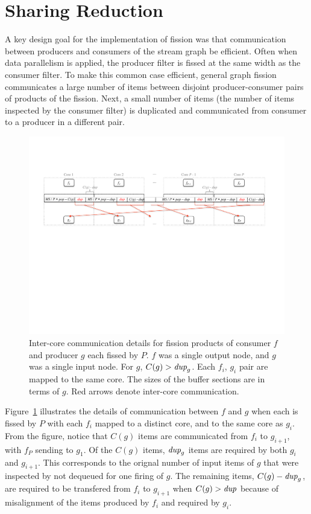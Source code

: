 \section{Sharing Reduction}

A key design goal for the implementation of fission was that
communication between producers and consumers of the stream graph be
efficient.  Often when data parallelism is applied, the producer
filter is fissed at the same width as the consumer filter.  To make
this common case efficient, general graph fission communicates a large
number of items between disjoint producer-consumer pairs of products
of the fission.  Next, a small number of items (the number of items
inspected by the consumer filter) is duplicated and communicated from
consumer to a producer in a different pair.

\begin{figure}[t]
\centering
\includegraphics[width=6in]{figures/remaining-dup-case.pdf}
\caption[Extra inter-core communication when $C(g) > \mt{dup}_g$.]
{Inter-core communication details for fission products of consumer $f$
  and producer $g$ each fissed by $P$.  $f$ was a single output node,
  and $g$ was a single input node.  For $g$, $C(g) > \mt{dup}_g$.
  Each $f_i$, $g_i$ pair are mapped to the same core.  The sizes of
  the buffer sections are in terms of $g$. Red arrows denote
  inter-core communication.  \label{fig:remaining-dup}}
\end{figure}

Figure~\ref{fig:remaining-dup} illustrates the details of
communication between $f$ and $g$ when each is fissed by $P$ with each
$f_i$ mapped to a distinct core, and to the same core as $g_i$.  From
the figure, notice that $C(g)$ items are communicated from $f_i$ to
$g_{i+ 1}$, with $f_P$ sending to $g_1$.  Of the $C(g)$ items,
$\mbox{\it dup}_g$ items are required by both $g_i$ and $g_{i+1}$.  This
corresponds to the orignal number of input items of $g$ that were
inspected by not dequeued for one firing of $g$.  The remaining items,
$C(g) - \mbox{\it dup}_g$, are required to be transfered from $f_i$ to
$g_{i+1}$ when $C(g) > \mbox{\it dup}$ because of misalignment of the items
produced by $f_i$ and required by $g_i$.

